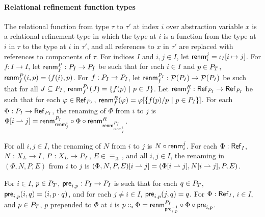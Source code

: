 \paragraph{Relational refinement function types}
%
The relational function from type $\tau$ to $\tau'$ at index $i$ over
abstraction variable $x$ is a relational refinement type in which the
type at $i$ is a function from the type at $i$ in $\tau$ to the type
at $i$ in $\tau'$, and all references to $x$ in $\tau'$ are replaced
with references to components of $\tau$.
For indices $I$ and $i, j \in I$, let
$\mathsf{renm}_{i}^{j} = \iota_I  [ i \mapsto j ]$.
For $f : I \to I$, let $\mathsf{renm}_{f}^P : P_{I} \to P_{I}$ be
such that for each $i \in I$ and $p \in P_T$,
$\mathsf{renm}_{f}^P(i, p) = (f(i), p)$.
For $f : P_{I} \to P_{I}$, let
$\mathsf{renm}_{f}^{P_I} : \mathcal{P}(P_{I}) \to \mathcal{P}(P_{I})$ be such
that for all $J \subseteq P_{I}$, $\renameidxpos{f}(J) = %
\setformer{ f(p) }{ p \in J }$.
Let
$\mathsf{renm}_{f}^R : \mathsf{Ref}_{ P_{I} } \to \mathsf{Ref}_{ P_{I} }$
be such that for each $\varphi \in \mathsf{Ref}_{ P_{I} }$,
$\mathsf{renm}_{f}^R(\varphi) = \varphi[ \{  f(p) / p \ |\  p \in
  P_{I}  \} ]$.
%
For each $\Phi : P_{I} \to \mathsf{Ref}_{ P_{I} }$, the renaming
of $\Phi$ from $i$ to $j$ is
$ \Phi [  i  \rightharpoonup  j  ] = \mathsf{renm}_{ \mathsf{renm}_{j}^{i} }^{P_I} \circ
\Phi \circ \mathsf{renm}_{ \mathsf{renm}_{ \mathsf{renm}_{j}^{i} }^{P_I} }^R$.

For all $i, j \in I$, the renaming of $N$ from $i$ to $j$ is
$N \circ \mathsf{renm}_{i}^{j}$.
%
For each $\Phi : \mathsf{Ref}_{ I }$, $N : X_L \to I$,
$P : X_L \to P_T$, $E \in \equiv_{\mathcal{X}}$, and all
$i, j \in I$, the renaming in $(\Phi, N, P, E)$ from $i$ to $j$ is
$(\Phi, N, P, E) [  i  \rightharpoonup  j  ] = ( \Phi [  i  \rightharpoonup  j  ],
 N [  i  \rightharpoonup  j  ], P, E)$.

For $i \in I$, $p \in P_T$,
$\mathsf{pre}_{i, p} : P_{I} \to P_{I}$ is such that for each
$q \in P_T$, $\mathsf{pre}_{i, p}(i, q) = (i, p \cdot q)$, and for
each $j \not= i \in I$, $\mathsf{pre}_{i, p}(j, q) = q$.
%
For $\Phi : \mathsf{Ref}_{ I }$, $i \in I$, and $p \in P_T$, $p$
prepended to $\Phi$ at $i$ is $p \prepend{i} \Phi = %
\renameidxpos{ \inv{ \prependpos{i}{p} } } \compose \Phi \compose
\prependpos{i}{p}$.


